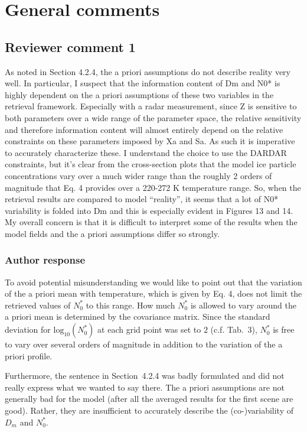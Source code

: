 \section{General comments}

\subsection*{Reviewer comment 1}

As noted in Section 4.2.4, the a priori assumptions do not describe reality very
well. In particular, I suspect that the information content of Dm and N0* is
highly dependent on the a priori assumptions of these two variables in the
retrieval framework. Especially with a radar measurement, since Z is sensitive
to both parameters over a wide range of the parameter space, the relative
sensitivity and therefore information content will almost entirely depend on the
relative constraints on these parameters imposed by Xa and Sa. As such it is
imperative to accurately characterize these. I understand the choice to use the
DARDAR constraints, but it’s clear from the cross-section plots that the model
ice particle concentrations vary over a much wider range than the roughly 2
orders of magnitude that Eq. 4 provides over a 220-272 K temperature range. So,
when the retrieval results are compared to model “reality”, it seems that a lot
of N0* variability is folded into Dm and this is especially evident in Figures
13 and 14. My overall concern is that it is difficult to interpret some of the
results when the model fields and the a priori assumptions differ so strongly.

\subsubsection*{Author response}

To avoid potential misunderstanding we would like to point out that the
variation of the a priori mean with temperature, which is given by Eq. 4, does
not limit the retrieved values of $N_0^*$ to this range. How much $N_0^*$ is
allowed to vary around the a priori mean is determined by the covariance matrix.
Since the standard deviation for $\text{log}_{10}(N_0^*)$ at each grid point was
set to $2$ (c.f. Tab.~3), $N_0^*$ is free to vary over several orders of
magnitude in addition to the variation of the a priori profile.

Furthermore, the sentence in Section~4.2.4 was badly formulated and did not
really express what we wanted to say there. The a priori assumptions are not
generally bad for the model (after all the averaged results for the first scene
are good). Rather, they are insufficient to accurately describe the
(co-)variability of $D_m$ and $N_0^*$.

